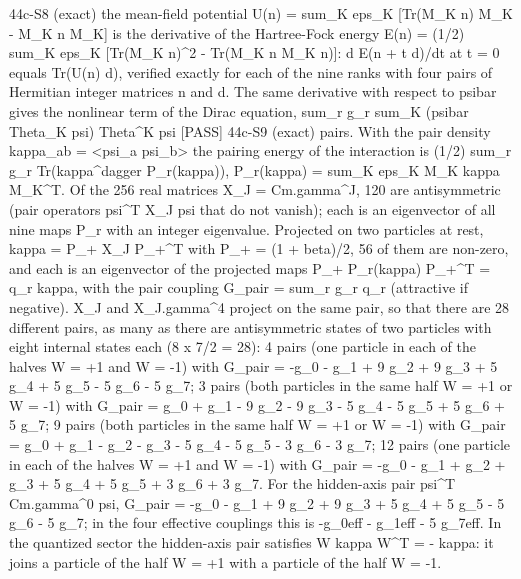 \documentclass[
  10pt,
]{article}
\newenvironment{Shaded}{}{}
\newcommand{\NormalTok}[1]{#1}
\begin{document}
\begin{Shaded}
\begin{Highlighting}[]
\NormalTok{[PASS] 44c{-}S8  (exact) the mean{-}field potential U(n) = sum\_K eps\_K [Tr(M\_K n) M\_K {-} M\_K n M\_K] is the derivative of the Hartree{-}Fock energy E(n) = (1/2) sum\_K eps\_K [Tr(M\_K n)\^{}2 {-} Tr(M\_K n M\_K n)]: d E(n + t d)/dt at t = 0 equals Tr(U(n) d), verified exactly for each of the nine ranks with four pairs of Hermitian integer matrices n and d. The same derivative with respect to psibar gives the nonlinear term of the Dirac equation, sum\_r g\_r sum\_K (psibar Theta\_K psi) Theta\^{}K psi}
\NormalTok{[PASS] 44c{-}S9  (exact) pairs. With the pair density kappa\_ab = \textless{}psi\_a psi\_b\textgreater{} the pairing energy of the interaction is (1/2) sum\_r g\_r Tr(kappa\^{}dagger P\_r(kappa)), P\_r(kappa) = sum\_K eps\_K M\_K kappa M\_K\^{}T. Of the 256 real matrices X\_J = Cm.gamma\^{}J, 120 are antisymmetric (pair operators psi\^{}T X\_J psi that do not vanish); each is an eigenvector of all nine maps P\_r with an integer eigenvalue. Projected on two particles at rest, kappa = P\_+ X\_J P\_+\^{}T with P\_+ = (1 + beta)/2, 56 of them are non{-}zero, and each is an eigenvector of the projected maps P\_+ P\_r(kappa) P\_+\^{}T = q\_r kappa, with the pair coupling G\_pair = sum\_r g\_r q\_r (attractive if negative). X\_J and X\_J.gamma\^{}4 project on the same pair, so that there are 28 different pairs, as many as there are antisymmetric states of two particles with eight internal states each (8 x 7/2 = 28): 4 pairs (one particle in each of the halves W = +1 and W = {-}1) with G\_pair = {-}g\_0 {-} g\_1 + 9 g\_2 + 9 g\_3 + 5 g\_4 + 5 g\_5 {-} 5 g\_6 {-} 5 g\_7; 3 pairs (both particles in the same half W = +1 or W = {-}1) with G\_pair = g\_0 + g\_1 {-} 9 g\_2 {-} 9 g\_3 {-} 5 g\_4 {-} 5 g\_5 + 5 g\_6 + 5 g\_7; 9 pairs (both particles in the same half W = +1 or W = {-}1) with G\_pair = g\_0 + g\_1 {-} g\_2 {-} g\_3 {-} 5 g\_4 {-} 5 g\_5 {-} 3 g\_6 {-} 3 g\_7; 12 pairs (one particle in each of the halves W = +1 and W = {-}1) with G\_pair = {-}g\_0 {-} g\_1 + g\_2 + g\_3 + 5 g\_4 + 5 g\_5 + 3 g\_6 + 3 g\_7. For the hidden{-}axis pair psi\^{}T Cm.gamma\^{}0 psi, G\_pair = {-}g\_0 {-} g\_1 + 9 g\_2 + 9 g\_3 + 5 g\_4 + 5 g\_5 {-} 5 g\_6 {-} 5 g\_7; in the four effective couplings this is {-}g\_0eff {-} g\_1eff {-} 5 g\_7eff. In the quantized sector the hidden{-}axis pair satisfies W kappa W\^{}T = {-} kappa: it joins a particle of the half W = +1 with a particle of the half W = {-}1.}

\end{Highlighting}
\end{Shaded}
\end{document}
